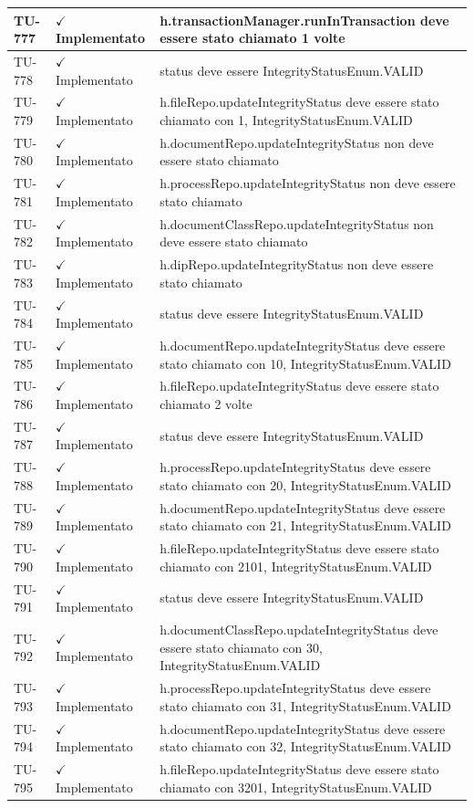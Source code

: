 ﻿\documentclass[a4paper,12pt]{article}
\newcommand{\ok}{\textcolor{green!60!black}{$\checkmark$ Implementato}}
\begin{document}
\begin{longtable}{|p{2cm}|p{3.5cm}|p{9.5cm}|}
\hline
TU-777 & \ok & h.transactionManager.runInTransaction deve essere stato chiamato 1 volte \\
\hline
TU-778 & \ok & status deve essere IntegrityStatusEnum.VALID \\
\hline
TU-779 & \ok & h.fileRepo.updateIntegrityStatus deve essere stato chiamato con 1, IntegrityStatusEnum.VALID \\
\hline
TU-780 & \ok & h.documentRepo.updateIntegrityStatus non deve essere stato chiamato \\
\hline
TU-781 & \ok & h.processRepo.updateIntegrityStatus non deve essere stato chiamato \\
\hline
TU-782 & \ok & h.documentClassRepo.updateIntegrityStatus non deve essere stato chiamato \\
\hline
TU-783 & \ok & h.dipRepo.updateIntegrityStatus non deve essere stato chiamato \\
\hline
TU-784 & \ok & status deve essere IntegrityStatusEnum.VALID \\
\hline
TU-785 & \ok & h.documentRepo.updateIntegrityStatus deve essere stato chiamato con 10, IntegrityStatusEnum.VALID \\
\hline
TU-786 & \ok & h.fileRepo.updateIntegrityStatus deve essere stato chiamato 2 volte \\
\hline
TU-787 & \ok & status deve essere IntegrityStatusEnum.VALID \\
\hline
TU-788 & \ok & h.processRepo.updateIntegrityStatus deve essere stato chiamato con 20, IntegrityStatusEnum.VALID \\
\hline
TU-789 & \ok & h.documentRepo.updateIntegrityStatus deve essere stato chiamato con 21, IntegrityStatusEnum.VALID \\
\hline
TU-790 & \ok & h.fileRepo.updateIntegrityStatus deve essere stato chiamato con 2101, IntegrityStatusEnum.VALID \\
\hline
TU-791 & \ok & status deve essere IntegrityStatusEnum.VALID \\
\hline
TU-792 & \ok & h.documentClassRepo.updateIntegrityStatus deve essere stato chiamato con 30, IntegrityStatusEnum.VALID \\
\hline
TU-793 & \ok & h.processRepo.updateIntegrityStatus deve essere stato chiamato con 31, IntegrityStatusEnum.VALID \\
\hline
TU-794 & \ok & h.documentRepo.updateIntegrityStatus deve essere stato chiamato con 32, IntegrityStatusEnum.VALID \\
\hline
TU-795 & \ok & h.fileRepo.updateIntegrityStatus deve essere stato chiamato con 3201, IntegrityStatusEnum.VALID \\

\end{longtable}
\end{document}
